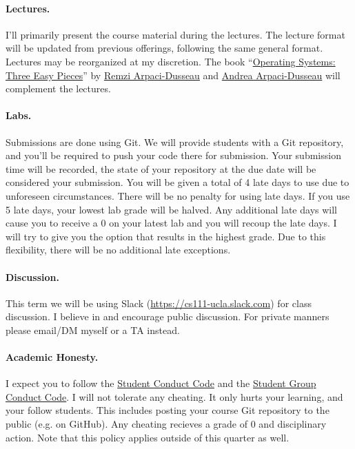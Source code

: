 \documentclass[12pt]{article}
\begin{document}
\paragraph{Lectures.}

I'll primarily present the course material during the lectures.
The lecture format will be updated from previous offerings, following the same
general format.
Lectures may be reorganized at my discretion.
The book
``\href{https://pages.cs.wisc.edu/~remzi/OSTEP/}
       {Operating Systems: Three Easy Pieces}''
by \href{http://www.cs.wisc.edu/~remzi}{Remzi Arpaci-Dusseau}
and \href{http://www.cs.wisc.edu/~dusseau}{Andrea Arpaci-Dusseau}
will complement the lectures.

\paragraph{Labs.}

Submissions are done using Git.
We will provide students with a Git repository, and you'll be required to
push your code there for submission.
Your submission time will be recorded, the state of your repository at the due
date will be considered your submission.
You will be given a total of 4 late days to use due to unforeseen circumstances.
There will be no penalty for using late days.
If you use 5 late days, your lowest lab grade will be halved.
Any additional late days will cause you to receive a 0 on your latest lab and
you will recoup the late days.
I will try to give you the option that results in the highest grade.
Due to this flexibility, there will be no additional late exceptions.

\paragraph{Discussion.}

This term we will be using Slack (\url{https://cs111-ucla.slack.com})
for class discussion.
I believe in and encourage public discussion.
For private manners please email/DM myself or a TA instead.

\paragraph{Academic Honesty.}

I expect you to follow the
\href{https://deanofstudents.ucla.edu/individual-student-code}
     {Student Conduct Code}
and the
\href{https://deanofstudents.ucla.edu/group-student-code}
     {Student Group Conduct Code}.
I will not tolerate any cheating.
It only hurts your learning, and your follow students.
This includes posting your course Git repository to the public
(e.g. on GitHub).
Any cheating recieves a grade of 0 and disciplinary action.
Note that this policy applies outside of this quarter as well.
\end{document}
